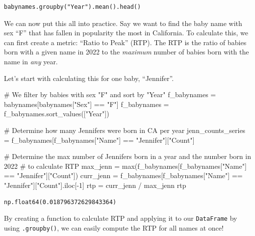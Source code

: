 \documentclass[
  letterpaper,
  DIV=11,
  numbers=noendperiod]{scrreprt}
\newenvironment{Shaded}{\begin{snugshade}}{\end{snugshade}}
\newcommand{\BuiltInTok}[1]{\textcolor[rgb]{0.00,0.23,0.31}{#1}}
\newcommand{\CommentTok}[1]{\textcolor[rgb]{0.37,0.37,0.37}{#1}}
\newcommand{\DecValTok}[1]{\textcolor[rgb]{0.68,0.00,0.00}{#1}}
\newcommand{\NormalTok}[1]{\textcolor[rgb]{0.00,0.23,0.31}{#1}}
\newcommand{\OperatorTok}[1]{\textcolor[rgb]{0.37,0.37,0.37}{#1}}
\newcommand{\StringTok}[1]{\textcolor[rgb]{0.13,0.47,0.30}{#1}}
\begin{document}
\begin{verbatim}
babynames.groupby("Year").mean().head()
\end{verbatim}

We can now put this all into practice. Say we want to find the baby name
with sex ``F'' that has fallen in popularity the most in California. To
calculate this, we can first create a metric: ``Ratio to Peak'' (RTP).
The RTP is the ratio of babies born with a given name in 2022 to the
\emph{maximum} number of babies born with the name in \emph{any} year.

Let's start with calculating this for one baby, ``Jennifer''.

\begin{Shaded}
\begin{Highlighting}[]
\CommentTok{\# We filter by babies with sex "F" and sort by "Year"}
\NormalTok{f\_babynames }\OperatorTok{=}\NormalTok{ babynames[babynames[}\StringTok{"Sex"}\NormalTok{] }\OperatorTok{==} \StringTok{"F"}\NormalTok{]}
\NormalTok{f\_babynames }\OperatorTok{=}\NormalTok{ f\_babynames.sort\_values([}\StringTok{"Year"}\NormalTok{])}

\CommentTok{\# Determine how many Jennifers were born in CA per year}
\NormalTok{jenn\_counts\_series }\OperatorTok{=}\NormalTok{ f\_babynames[f\_babynames[}\StringTok{"Name"}\NormalTok{] }\OperatorTok{==} \StringTok{"Jennifer"}\NormalTok{][}\StringTok{"Count"}\NormalTok{]}

\CommentTok{\# Determine the max number of Jennifers born in a year and the number born in 2022 }
\CommentTok{\# to calculate RTP}
\NormalTok{max\_jenn }\OperatorTok{=} \BuiltInTok{max}\NormalTok{(f\_babynames[f\_babynames[}\StringTok{"Name"}\NormalTok{] }\OperatorTok{==} \StringTok{"Jennifer"}\NormalTok{][}\StringTok{"Count"}\NormalTok{])}
\NormalTok{curr\_jenn }\OperatorTok{=}\NormalTok{ f\_babynames[f\_babynames[}\StringTok{"Name"}\NormalTok{] }\OperatorTok{==} \StringTok{"Jennifer"}\NormalTok{][}\StringTok{"Count"}\NormalTok{].iloc[}\OperatorTok{{-}}\DecValTok{1}\NormalTok{]}
\NormalTok{rtp }\OperatorTok{=}\NormalTok{ curr\_jenn }\OperatorTok{/}\NormalTok{ max\_jenn}
\NormalTok{rtp}
\end{Highlighting}
\end{Shaded}

\begin{verbatim}
np.float64(0.018796372629843364)
\end{verbatim}

By creating a function to calculate RTP and applying it to our
\texttt{DataFrame} by using \texttt{.groupby()}, we can easily compute
the RTP for all names at once!
\end{document}
